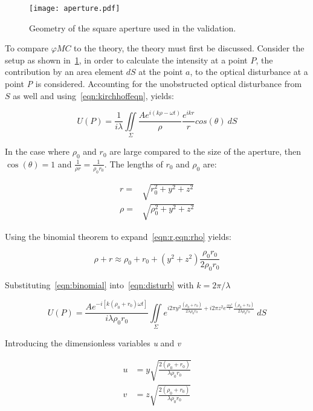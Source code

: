 \medskip
\begin{figure}[!ht]
    \centering
    \texttt{[image: aperture.pdf]}
    \caption{Geometry of the square aperture used in the validation.}
    \label{fig:aperture}
\end{figure}

To compare $\varphi MC$ to the theory, the theory must first be discussed.
Consider the setup as shown in~\cref{fig:aperture}, in order to calculate the intensity at a point $P$, the contribution by an area element $dS$ at the point $a$, to the optical disturbance at a point \textit{P} is considered.
Accounting for the unobstructed optical disturbance from $S$ as well and using~\cref{eqn:kirchhoffeqn}, yields: 


\begin{equation}
U(P)=\frac{1}{i\lambda}\iint\limits_{\Sigma} \frac{Ae^{i(k\rho-\omega t)}}{\rho} \frac{e^{ikr}}{r}cos(\theta)\ dS
\label{eqn:disturb}
\end{equation}


In the case where $\rho_0$ and $r_0$ are large compared to the size of the aperture, then $\cos\left(\theta\right) = 1$ and $\tfrac{1}{\rho r}=\tfrac{1}{\rho_0 r_0}$.
The lengths of $r_0$ and $\rho_0$ are:

\begin{align}
r=&\sqrt{r_0^2+y^2+z^2}\label{eqn:r} \\
\rho=&\sqrt{\rho_0^2+y^2+z^2}\label{eqn:rho}
\end{align}

Using the binomial theorem to expand~\cref{eqn:r,eqn:rho} yields:

\begin{equation}
\rho + r \approx \rho_0 + r_0 + (y^2+z^2)\frac{\rho_0r_0}{2\rho_0r_0}
\label{eqn:binomial}
\end{equation}

Substituting~\cref{eqn:binomial} into~\cref{eqn:disturb} with $k=2\pi/\lambda$

\begin{equation}
U(P)=\frac{Ae^{-i[k(\rho_0+r_0)\omega t]}}{i\lambda\rho_0r_0}\iint\limits_{\Sigma} e^{i2\pi y^2\tfrac{(\rho_0+r_0)}{2\lambda\rho_0r_0}+i2\pi z^2e^{\frac{i\pi u^2}{2}}\tfrac{(\rho_0+r_0)}{2\lambda\rho_0r_0}} \ dS
\label{eqn:midway}
\end{equation}


Introducing the dimensionless variables \textit{u} and \textit{v}

\begin{align}
u&=y\sqrt{\frac{2(\rho_0+r_0)}{\lambda\rho_0r_0}}\\
v&=z\sqrt{\frac{2(\rho_0+r_0)}{\lambda\rho_0r_0}}
\end{align}

